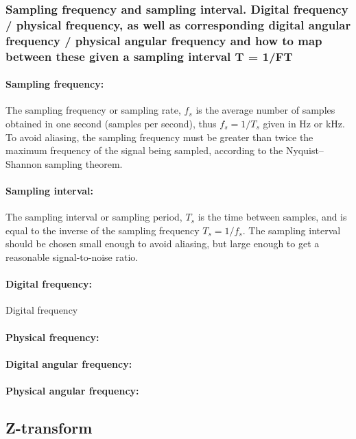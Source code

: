 \documentclass{article}
\begin{document}
\subsubsection{Sampling frequency and sampling interval. Digital frequency / physical frequency, as well as
corresponding digital angular frequency / physical angular frequency and how to map between these
given a sampling interval T = 1/FT}

\paragraph{Sampling frequency:}
The sampling frequency or sampling rate, $f_s$ is the average number of samples obtained in one second (samples per second), thus $f_s = 1/T_s$ given in Hz or kHz. To avoid aliasing, the sampling frequency must be greater than twice the maximum frequency of the signal being sampled, according to the Nyquist–Shannon sampling theorem.

\paragraph{Sampling interval:}
The sampling interval or sampling period, $T_s$ is the time between samples, and is equal to the inverse of the sampling frequency $T_s = 1/f_s$. The sampling interval should be chosen small enough to avoid aliasing, but large enough to get a reasonable signal-to-noise ratio.

\paragraph{Digital frequency:}
Digital frequency 

\paragraph{Physical frequency:}


\paragraph{Digital angular frequency:}

\paragraph{Physical angular frequency:}


\subsection{Z-transform}
\end{document}
